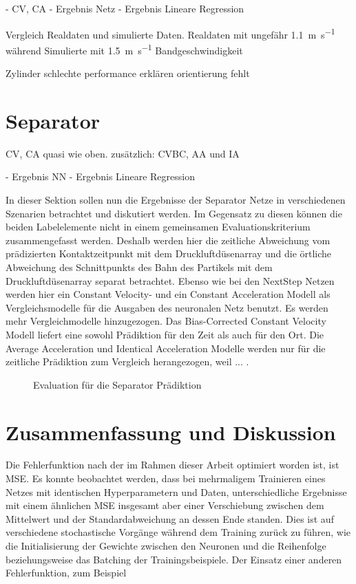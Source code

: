 \color{blue}
- CV, CA
- Ergebnis Netz
- Ergebnis Lineare Regression


Vergleich Realdaten und simulierte Daten.
Realdaten mit ungefähr \SI{1.1}{\meter\per\second} während Simulierte mit \SI{1.5}{\metre\per\second} Bandgeschwindigkeit 

Zylinder schlechte performance erklären \textrightarrow orientierung fehlt
\color{black}

\section{Separator}

\color{blue}
CV, CA quasi wie oben.
zusätzlich: CVBC, AA und IA

- Ergebnis NN
- Ergebnis Lineare Regression
\color{black}



In dieser Sektion sollen nun die Ergebnisse der Separator Netze in verschiedenen Szenarien betrachtet und diskutiert werden.
Im Gegensatz zu diesen können die beiden Labelelemente nicht in einem gemeinsamen Evaluationskriterium zusammengefasst werden.
Deshalb werden hier die zeitliche Abweichung vom prädizierten Kontaktzeitpunkt mit dem Druckluftdüsenarray und die örtliche Abweichung des Schnittpunkts des Bahn des Partikels mit dem Druckluftdüsenarray separat betrachtet.
Ebenso wie bei den NextStep Netzen werden hier ein Constant Velocity- und ein Constant Acceleration Modell als Vergleichsmodelle für die Ausgaben des neuronalen Netz benutzt.
Es werden mehr Vergleichmodelle hinzugezogen. 
Das Bias-Corrected Constant Velocity Modell liefert eine sowohl Prädiktion für den Zeit als auch für den Ort.
Die Average Acceleration und Identical Acceleration Modelle werden nur für die zeitliche Prädiktion zum Vergleich herangezogen,
weil ...
.



\begin{figure}[h]
    \centering
	\caption{Evaluation für die Separator Prädiktion}
	\label{fig:boxplotErrorNNSeparator}
\end{figure}


\section{Zusammenfassung und Diskussion}


Die Fehlerfunktion nach der im Rahmen dieser Arbeit optimiert worden ist, ist MSE.
Es konnte beobachtet werden, dass bei mehrmaligem Trainieren eines Netzes 
mit identischen Hyperparametern und Daten, unterschiedliche Ergebnisse mit einem ähnlichen MSE insgesamt aber einer Verschiebung zwischen dem Mittelwert und der Standardabweichung  
an dessen Ende standen.
Dies ist auf verschiedene stochastische Vorgänge während dem Training zurück zu führen, wie die Initialisierung der Gewichte zwischen den Neuronen und die Reihenfolge beziehungsweise das Batching der Trainingsbeispiele.
Der Einsatz einer anderen Fehlerfunktion, zum Beispiel 

